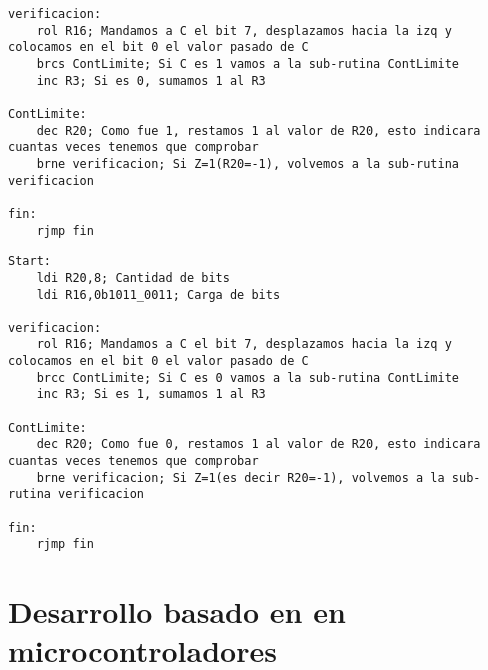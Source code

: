 \documentclass[
	12pt, %
	fleqn, %
	a4paper, %
	oneside, %
]{LegrandOrangeBook}
\begin{document}
\begin{enumerate}
\begin{lstlisting}[language={[RISC-V]Assembler},frame=single,caption={Contador de ceros},captionpos=b,numbers=none]
verificacion:
	rol R16; Mandamos a C el bit 7, desplazamos hacia la izq y colocamos en el bit 0 el valor pasado de C
	brcs ContLimite; Si C es 1 vamos a la sub-rutina ContLimite
	inc R3; Si es 0, sumamos 1 al R3

ContLimite:
	dec R20; Como fue 1, restamos 1 al valor de R20, esto indicara cuantas veces tenemos que comprobar
	brne verificacion; Si Z=1(R20=-1), volvemos a la sub-rutina verificacion

fin:
	rjmp fin
\end{lstlisting}
\begin{lstlisting}[language={[RISC-V]Assembler},frame=single,caption={Contador de unos},captionpos=b,numbers=none]
Start:
	ldi R20,8; Cantidad de bits
	ldi R16,0b1011_0011; Carga de bits

verificacion:
	rol R16; Mandamos a C el bit 7, desplazamos hacia la izq y colocamos en el bit 0 el valor pasado de C
	brcc ContLimite; Si C es 0 vamos a la sub-rutina ContLimite
	inc R3; Si es 1, sumamos 1 al R3

ContLimite:
	dec R20; Como fue 0, restamos 1 al valor de R20, esto indicara cuantas veces tenemos que comprobar
	brne verificacion; Si Z=1(es decir R20=-1), volvemos a la sub-rutina verificacion

fin:
	rjmp fin
\end{lstlisting}
\end{enumerate}
\chapter{Desarrollo basado en en microcontroladores}
\end{document}
